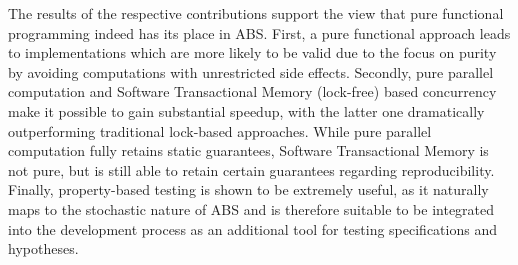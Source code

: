 The results of the respective contributions support the view that pure functional programming indeed has its place in ABS. First, a pure functional approach leads to implementations which are more likely to be valid due to the focus on purity by avoiding computations with unrestricted side effects. Secondly, pure parallel computation and Software Transactional Memory (lock-free) based concurrency make it possible to gain substantial speedup, with the latter one dramatically outperforming traditional lock-based approaches. While pure parallel computation fully retains static guarantees, Software Transactional Memory is not pure, but is still able to retain certain guarantees regarding reproducibility. Finally, property-based testing is shown to be extremely useful, as it naturally maps to the stochastic nature of ABS and is therefore suitable to be integrated into the development process as an additional tool for testing specifications and hypotheses.


